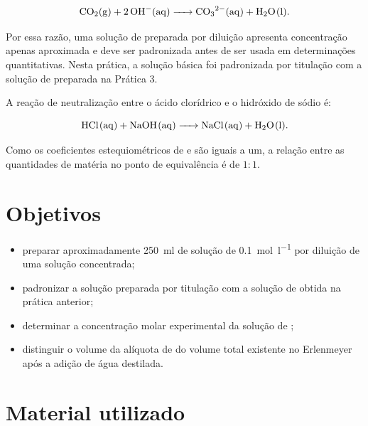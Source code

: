 \documentclass[a4paper,12pt]{article}
\begin{document}
\begin{equation}
  \ce{CO2(g) + 2OH-(aq) -> CO3^2-(aq) + H2O(l)}.
  \label{eq:co2}
\end{equation}

Por essa razão, uma solução de  preparada por diluição apresenta
concentração apenas aproximada e deve ser padronizada antes de ser usada em
determinações quantitativas. Nesta prática, a solução básica foi padronizada
por titulação com a solução de  preparada na Prática 3.

A reação de neutralização entre o ácido clorídrico e o hidróxido de sódio é:

\begin{equation}
  \ce{HCl(aq) + NaOH(aq) -> NaCl(aq) + H2O(l)}.
  \label{eq:neutralizacao}
\end{equation}

Como os coeficientes estequiométricos de  e  são iguais a
um, a relação entre as quantidades de matéria no ponto de equivalência é de
$1:1$.

\section{Objetivos}

\begin{itemize}
  \item preparar aproximadamente \qty{250}{\milli\litre} de solução de
         \qty{0.1}{\mole\per\litre} por diluição de uma solução
        concentrada;
  \item padronizar a solução preparada por titulação com a solução de
         obtida na prática anterior;
  \item determinar a concentração molar experimental da solução de
        ;
  \item distinguir o volume da alíquota de  do volume total
        existente no Erlenmeyer após a adição de água destilada.
\end{itemize}

\section{Material utilizado}
\end{document}
